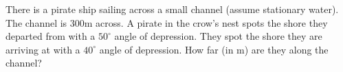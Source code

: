 There is a pirate ship sailing across a small channel (assume stationary water). The channel is $300$m across. A pirate in the crow's nest spots the shore they departed from with a $50^{\circ}$ angle of depression. They spot the shore they are arriving at with a $40^{\circ}$ angle of depression. How far (in m) are they along the channel?
